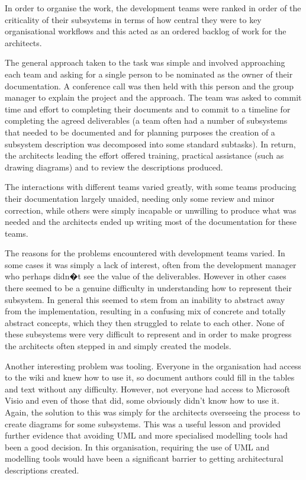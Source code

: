   In order to organise the work, the development teams were ranked in order of the criticality of their subsystems in terms of how central they were to key organisational workflows and this acted as an ordered backlog of work for the architects.

  The general approach taken to the task was simple and involved approaching each team and asking for a single person to be nominated as the owner of their documentation.  A conference call was then held with this person and the group manager to explain the project and the approach.  The team was asked to commit time and effort to completing their documents and to commit to a timeline for completing the agreed deliverables (a team often had a number of subsystems that needed to be documented and for planning purposes the creation of a subsystem description was decomposed into some standard subtasks).  In return, the architects leading the effort offered training, practical assistance (such as drawing diagrams) and to review the descriptions produced.

  The interactions with different teams varied greatly, with some teams producing their documentation largely unaided, needing only some review and minor correction, while others were simply incapable or unwilling to produce what was needed and the architects ended up writing most of the documentation for these teams. 

  The reasons for the problems encountered with development teams varied.  In some cases it was simply a lack of interest, often from the development manager who perhaps didn�t see the value of the deliverables.  However in other cases there seemed to be a genuine difficulty in understanding how to represent their subsystem.  In general this seemed to stem from an inability to abstract away from the implementation, resulting in a confusing mix of concrete and totally abstract concepts, which they then struggled to relate to each other.  None of these subsystems were very difficult to represent and in order to make progress the architects often stepped in and simply created the models.

  Another interesting problem was tooling.  Everyone in the organisation had access to the wiki and knew how to use it, so document authors could fill in the tables and text without any difficulty.  However, not everyone had access to Microsoft Visio and even of those that did, some obviously didn't know how to use it.  Again, the solution to this was simply for the architects overseeing the process to create diagrams for some subsystems.  This was a useful lesson and provided further evidence that avoiding UML and more specialised modelling tools had been a good decision.  In this organisation, requiring the use of UML and modelling tools would have been a significant barrier to getting architectural descriptions created.


